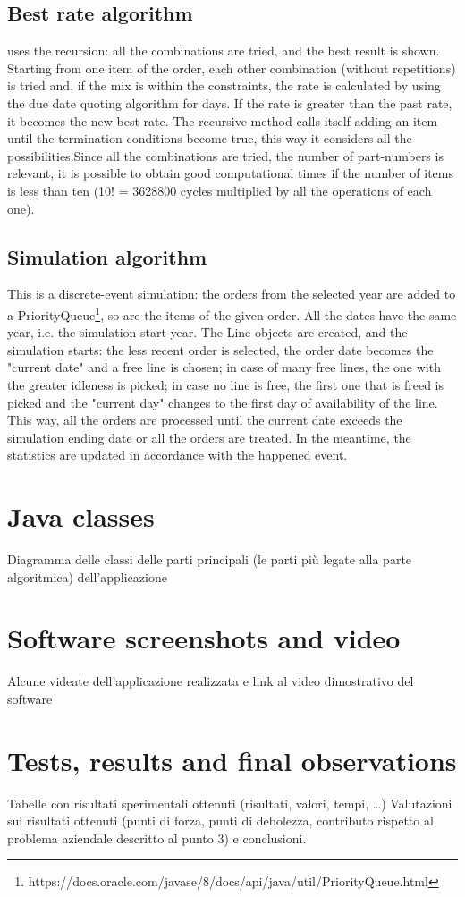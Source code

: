 \documentclass[a4paper,12pt]{article}
\begin{document}
\subsection{Best rate algorithm}
 uses the recursion: all the combinations are tried, and the best result is shown. Starting from one item of the order, each other combination (without repetitions) is tried and, if the mix is within the constraints, the rate is calculated by using the due date quoting algorithm for days. If the rate is greater than the past rate, it becomes the new best rate. The recursive method calls itself adding an item until the termination conditions become true, this way it considers all the possibilities.Since all the combinations are tried, the number of part-numbers is relevant, it is possible to obtain good computational times if the number of items is less than ten (10! =  3628800 cycles multiplied by all the operations of each one). 

\subsection{Simulation algorithm}
 This is a discrete-event simulation: the orders from the selected year are added to a PriorityQueue\footnote{https://docs.oracle.com/javase/8/docs/api/java/util/PriorityQueue.html}, so are the items of the given order. All the dates have the same year, i.e. the simulation start year. The Line objects are created, and the simulation starts: the less recent order is selected, the order date becomes the "current date" and a free line is chosen; in case of many free lines, the one with the greater idleness is picked; in case no line is free, the first one that is freed is picked and the "current day" changes to the first day of availability of the line. This way, all the orders are processed until the current date exceeds the simulation ending date or all the orders are treated. In the meantime, the statistics are updated in accordance with the happened event.

\newpage
\section{Java classes}
Diagramma delle classi delle parti principali (le parti più legate alla parte algoritmica) dell’applicazione

\newpage
\section{Software screenshots and video}
Alcune videate dell’applicazione realizzata e link al video dimostrativo del software

\newpage
\section{Tests, results and final observations}
Tabelle con risultati sperimentali ottenuti (risultati, valori, tempi, …)
Valutazioni sui risultati ottenuti (punti di forza, punti di debolezza, contributo rispetto al problema aziendale descritto al punto 3) e conclusioni.
\end{document}
